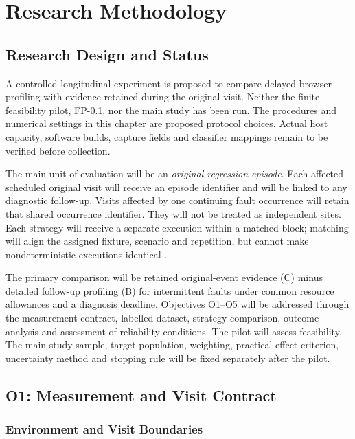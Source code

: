 \chapter{Research Methodology}
\label{chap:methodology}

\section{Research Design and Status}
\label{sec:method-status}

A controlled longitudinal experiment is proposed to compare delayed browser profiling with evidence retained during the original visit. Neither the finite feasibility pilot, FP-0.1, nor the main study has been run. The procedures and numerical settings in this chapter are proposed protocol choices. Actual host capacity, software builds, capture fields and classifier mappings remain to be verified before collection.

The main unit of evaluation will be an \emph{original regression episode}. Each affected scheduled original visit will receive an episode identifier and will be linked to any diagnostic follow-up. Visits affected by one continuing fault occurrence will retain that shared occurrence identifier. They will not be treated as independent sites. Each strategy will receive a separate execution within a matched block; matching will align the assigned fixture, scenario and repetition, but cannot make nondeterministic executions identical \parencite{GJMALCNF,E8MGSAC8,B9FIJAKE}.

The primary comparison will be retained original-event evidence (C) minus detailed follow-up profiling (B) for intermittent faults under common resource allowances and a diagnosis deadline. Objectives O1--O5 will be addressed through the measurement contract, labelled dataset, strategy comparison, outcome analysis and assessment of reliability conditions. The pilot will assess feasibility. The main-study sample, target population, weighting, practical effect criterion, uncertainty method and stopping rule will be fixed separately after the pilot.

\section{O1: Measurement and Visit Contract}
\label{sec:o1-contract}

\subsection{Environment and Visit Boundaries}


